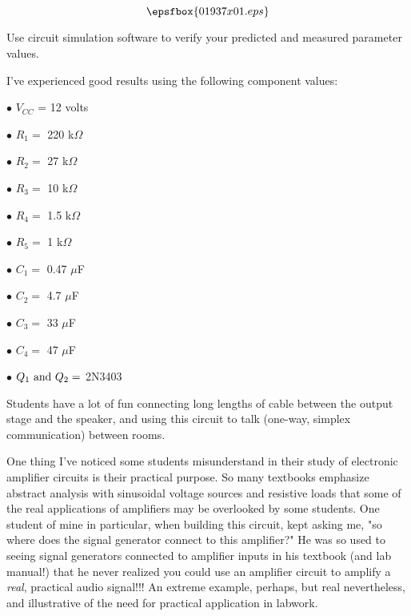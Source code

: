 

$$\epsfbox{01937x01.eps}$$

\vfil \eject






Use circuit simulation software to verify your predicted and measured parameter values.







I've experienced good results using the following component values:

\medskip
\item{$\bullet$} $V_{CC}$ = 12 volts
\item{$\bullet$} $R_1 = $ 220 k$\Omega$
\item{$\bullet$} $R_2 = $ 27 k$\Omega$
\item{$\bullet$} $R_3 = $ 10 k$\Omega$
\item{$\bullet$} $R_4 = $ 1.5 k$\Omega$
\item{$\bullet$} $R_5 = $ 1 k$\Omega$
\item{$\bullet$} $C_1 = $ 0.47 $\mu$F
\item{$\bullet$} $C_2 = $ 4.7 $\mu$F
\item{$\bullet$} $C_3 = $ 33 $\mu$F
\item{$\bullet$} $C_4 = $ 47 $\mu$F
\item{$\bullet$} $Q_1 \hbox{ and } Q_2 = $ 2N3403
\medskip

Students have a lot of fun connecting long lengths of cable between the output stage and the speaker, and using this circuit to talk (one-way, simplex communication) between rooms.

One thing I've noticed some students misunderstand in their study of electronic amplifier circuits is their practical purpose.  So many textbooks emphasize abstract analysis with sinusoidal voltage sources and resistive loads that some of the real applications of amplifiers may be overlooked by some students.  One student of mine in particular, when building this circuit, kept asking me, "so where does the signal generator connect to this amplifier?"  He was so used to seeing signal generators connected to amplifier inputs in his textbook (and lab manual!) that he never realized you could use an amplifier circuit to amplify a {\it real}, practical audio signal!!!  An extreme example, perhaps, but real nevertheless, and illustrative of the need for practical application in labwork.

